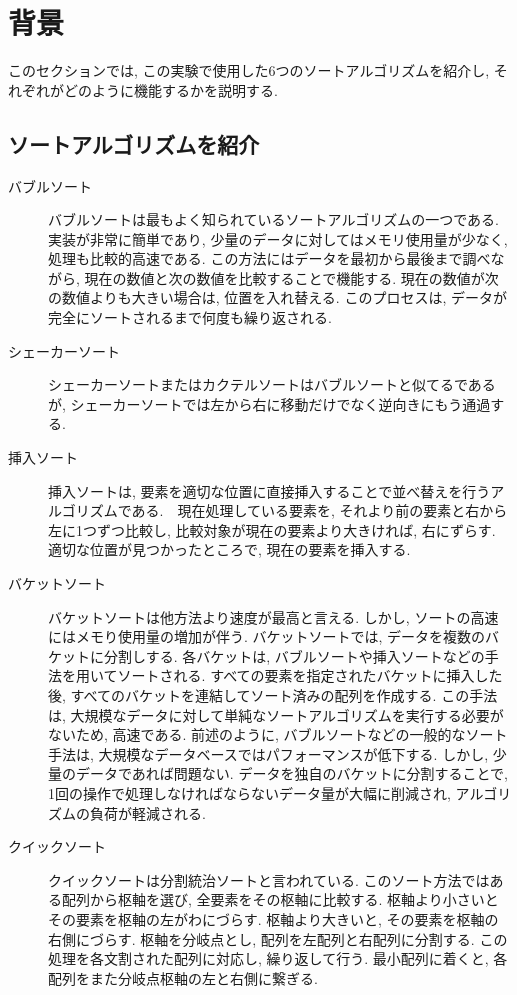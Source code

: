 \documentclass[a4j, 11pt]{jarticle}
\begin{document}
\section{背景}
このセクションでは, この実験で使用した6つのソートアルゴリズムを紹介し, それぞれがどのように機能するかを説明する.
\subsection{ソートアルゴリズムを紹介}
\begin{description}
  \item[バブルソート] バブルソートは最もよく知られているソートアルゴリズムの一つである. 実装が非常に簡単であり, 少量のデータに対してはメモリ使用量が少なく, 処理も比較的高速である. この方法にはデータを最初から最後まで調べながら, 現在の数値と次の数値を比較することで機能する. 現在の数値が次の数値よりも大きい場合は, 位置を入れ替える. このプロセスは, データが完全にソートされるまで何度も繰り返される\cite{friend1956sort}.\\
  \item[シェーカーソート] シェーカーソートまたはカクテルソートはバブルソートと似てるであるが, シェーカーソートでは左から右に移動だけでなく逆向きにもう通過する\cite{shaker1961cocktail}. \\
  \item[挿入ソート] 挿入ソートは, 要素を適切な位置に直接挿入することで並べ替えを行うアルゴリズムである.　現在処理している要素を, それより前の要素と右から左に1つずつ比較し, 比較対象が現在の要素より大きければ, 右にずらす.　適切な位置が見つかったところで, 現在の要素を挿入する\cite{knuth1998insertion}. \\
  \item[バケットソート] バケットソートは他方法より速度が最高と言える. しかし, ソートの高速にはメモり使用量の増加が伴う. バケットソートでは, データを複数のバケットに分割しする. 各バケットは, バブルソートや挿入ソートなどの手法を用いてソートされる. すべての要素を指定されたバケットに挿入した後, すべてのバケットを連結してソート済みの配列を作成する. この手法は, 大規模なデータに対して単純なソートアルゴリズムを実行する必要がないため, 高速である. 前述のように, バブルソートなどの一般的なソート手法は, 大規模なデータベースではパフォーマンスが低下する. しかし, 少量のデータであれば問題ない. データを独自のバケットに分割することで, 1回の操作で処理しなければならないデータ量が大幅に削減され, アルゴリズムの負荷が軽減される\cite{corwin2004bucket}. \\
  \item[クイックソート] クイックソートは分割統治ソートと言われている. このソート方法ではある配列から枢軸を選び, 全要素をその枢軸に比較する. 枢軸より小さいとその要素を枢軸の左がわにづらす. 枢軸より大きいと, その要素を枢軸の右側にづらす. 枢軸を分岐点とし, 配列を左配列と右配列に分割する. この処理を各文割された配列に対応し, 繰り返して行う. 最小配列に着くと, 各配列をまた分岐点枢軸の左と右側に繋ぎる\cite{hoare1961quicksort}. \\

\end{description}
\end{document}
